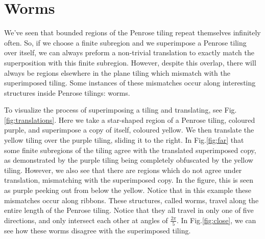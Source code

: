 \documentclass[
  oneside,
  11pt, a4paper,
  footinclude=true,
  headinclude=true,
  cleardoublepage=empty
]{scrbook}
\begin{document}
\section{Worms} 

We've seen that bounded regions of the Penrose tiling repeat themselves infinitely often. So, if we choose a finite subregion and we superimpose a Penrose tiling over itself, we can always preform a non-trivial translation to exactly match the superposition with this finite subregion. However, despite this overlap, there will always be regions elsewhere in the plane tiling which mismatch with the superimposed tiling. Some instances of these mismatches occur along interesting structures inside Penrose tilings: worms.

To visualize the process of superimposing a tiling and translating, see Fig.\ref{fig:translations}. Here we take a star-shaped region of a Penrose tiling, coloured purple, and superimpose a copy of itself, coloured yellow. We then translate the yellow tiling over the purple tiling, sliding it to the right. In Fig.\ref{fig:far} that some finite subregions of the tiling agree with the translated superimposed copy, as demonstrated by the purple tiling being completely obfuscated by the yellow tiling. However, we also see that there are regions which do not agree under translation, mismatching with the superimposed copy. In the figure, this is seen as purple peeking out from below the yellow. Notice that in this example these mismatches occur along ribbons. These structures, called worms, travel along the entire length of the Penrose tiling. Notice that they all travel in only one of five directions, and only intersect each other at angles of $\frac{2\pi}{5}$. In Fig.\ref{fig:close}, we can see how these worms disagree with the superimposed tiling.
\end{document}
